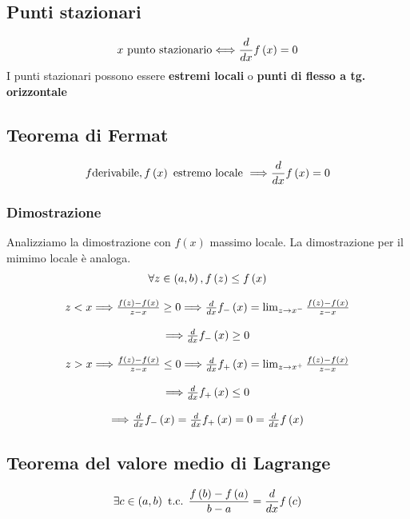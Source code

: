 \documentclass{report}
\begin{document}
    \subsection{Punti stazionari}
        $$x \textrm{ punto stazionario} \Longleftrightarrow \D{x}f\left(x\right) = 0$$
        I punti stazionari possono essere \textbf{estremi locali} o \textbf{punti di flesso a tg. orizzontale}
    \subsection{Teorema di Fermat}
        $$f \textrm{derivabile}, f\left(x\right) \textrm{ estremo locale } \Longrightarrow \D{x}f\left(x\right) = 0$$
        \subsubsection{Dimostrazione}
            Analizziamo la dimostrazione con $f\left(x\right)$ massimo locale. La dimostrazione per il mimimo locale è analoga. \\
            $$\begin{matrix}
                \forall z \in \left(a, b\right), f\left(z\right) \leq f\left(x\right) \\ \\ 
                z < x \Longrightarrow \frac{f\left(z\right) - f\left(x\right)}{z - x} \geq 0 \Longrightarrow 
                    \D{x}f_{-}\left(x\right) = \lim_{z \to x^-}\frac{f\left(z\right) - f\left(x\right)}{z - x} \\ \\
                \Longrightarrow \D{x}f_{-}\left(x\right) \geq 0 \\ \\
                z > x \Longrightarrow \frac{f\left(z\right) - f\left(x\right)}{z - x} \leq 0 \Longrightarrow 
                    \D{x}f_{+}\left(x\right) = \lim_{z \to x^+}\frac{f\left(z\right) - f\left(x\right)}{z - x} \\ \\
                \Longrightarrow \D{x}f_{+}\left(x\right) \leq 0 \\ \\
                \Longrightarrow \D{x}f_{-}\left(x\right) = \D{x}f_{+}\left(x\right) = 0 = \D{x}f\left(x\right)
            \end{matrix}$$
    \subsection{Teorema del valore medio di Lagrange}
        $$\exists c \in \left(a, b\right) \textrm{ t.c. } \frac{f\left(b\right) - f\left(a\right)}{b - a} = \D{x}f\left(c\right)$$
\end{document}
